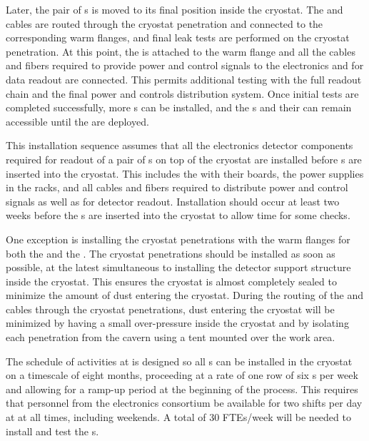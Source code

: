 Later, the pair of s is moved to its final position 
inside the cryostat. The 
and  cables are routed through the cryostat penetration and
connected to the corresponding warm flanges, and final leak tests are performed
on the cryostat penetration. At this point, the  is attached
to the warm flange and all the cables and fibers required to provide 
power and control signals to the  electronics and for data
readout are connected. This permits additional testing with the full 
 readout chain and the final power and controls distribution
system. Once initial tests are completed successfully, more s
can be installed, and the s and their  
can remain accessible until the  are deployed.

This installation sequence assumes that all the  electronics detector 
components required for readout of a pair of s  on top of the cryostat 
are installed before s are inserted into the cryostat. This 
includes the  with their boards, the power supplies in 
the racks, and all cables and fibers required to distribute power and
control signals as well as for detector readout. Installation should occur at least two weeks before
the s are inserted into the cryostat to allow time for some checks. 

One exception
is installing the cryostat penetrations with the warm flanges
for both the  and the . The cryostat
penetrations should be installed as soon as possible, at the latest
simultaneous to installing the detector support structure
inside the cryostat. This ensures the cryostat is almost 
completely sealed to minimize the amount of dust 
entering the cryostat. During the routing of the  and
 cables through the cryostat penetrations, dust entering the cryostat will be minimized by having a small
over-pressure inside the cryostat and by isolating each penetration
from the cavern using a tent mounted over 
the work area.

The schedule of activities at  is designed so all 
s can be installed in the cryostat on a timescale of eight
months, proceeding at a rate of one row of six s per week and
allowing for a ramp-up period at the beginning of the process. This
requires that personnel from the  electronics consortium be available
for two shifts per day at  at all times, including weekends. A
total of 30 FTEs/week will be needed to install and test the s. 

